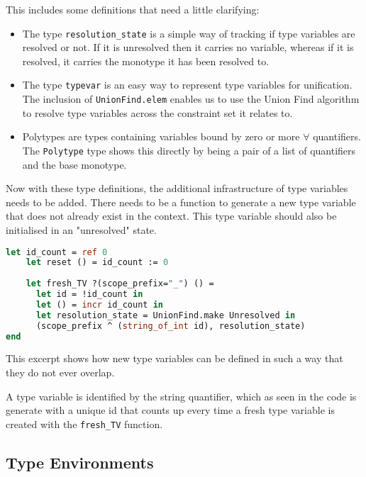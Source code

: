 \documentclass{l4proj}
\begin{document}
This includes some definitions that need a little clarifying:
\begin{itemize}
    \item The type \texttt{resolution\_state} is a simple way of tracking if type variables are resolved or not.
    If it is unresolved then it carries no variable, whereas if it is resolved, it carries the monotype it has been resolved to.
    \item The type \texttt{typevar} is an easy way to represent type variables for unification.
    The inclusion of \texttt{UnionFind.elem} enables us to use the Union Find algorithm to resolve type variables across the constraint set it relates to.
    \item Polytypes are types containing variables bound by zero or more $\forall$ quantifiers. 
    The \texttt{Polytype} type shows this directly by being a pair of a list of quantifiers and the base monotype.
\end{itemize}

Now with these type definitions, the additional infrastructure of type variables needs to be added.
There needs to be a function to generate a new type variable that does not already exist in the context.
This type variable should also be initialised in an "unresolved" state.

\begin{lstlisting}[language=Caml, caption=The simple implementation of type variables. The fresh\_TV function generates a new\, unresolved type variable.]
    let id_count = ref 0
    let reset () = id_count := 0
    
    let fresh_TV ?(scope_prefix="_") () =
      let id = !id_count in
      let () = incr id_count in
      let resolution_state = UnionFind.make Unresolved in
      (scope_prefix ^ (string_of_int id), resolution_state)
end
\end{lstlisting}

This excerpt shows how new type variables can be defined in such a way that they do not ever overlap.

A type variable is identified by the string quantifier, which as seen in the code is generate with a unique id that counts up every time a fresh type variable is created with the \texttt{fresh\_TV} function.

\subsection{Type Environments}
\end{document}
